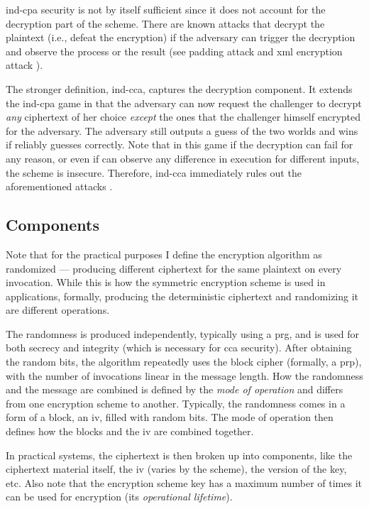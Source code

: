 			\acrshort{ind-cpa} security is not by itself sufficient since it does not account for the decryption part of the scheme.
			There are known attacks that decrypt the plaintext (i.e., defeat the encryption) if the adversary can trigger the decryption and observe the process or the result (see padding attack \cite{padding-attack} and \acrshort{xml} encryption attack \cite{xml-break-encryption}).

			The stronger definition, \acrfull{ind-cca}, captures the decryption component.
			It extends the \acrshort{ind-cpa} game in that the adversary can now request the challenger to decrypt \emph{any} ciphertext of her choice \emph{except} the ones that the challenger himself encrypted for the adversary.
			The adversary still outputs a guess of the two worlds and wins if reliably guesses correctly.
			Note that in this game if the decryption can fail for any reason, or even if \adversary{} can observe any difference in execution for different inputs, the scheme is insecure.
			Therefore, \acrshort{ind-cca} immediately rules out the aforementioned attacks \cite{padding-attack,xml-break-encryption}.

		\subsection{Components}

			Note that for the practical purposes I define the encryption algorithm as randomized --- producing different ciphertext for the same plaintext on every invocation.
			While this is how the symmetric encryption scheme is used in applications, formally, producing the deterministic ciphertext and randomizing it are different operations.

			The randomness is produced independently, typically using a \acrfull{prg}, and is used for both secrecy and integrity (which is necessary for \acrshort{cca} security).
			After obtaining the random bits, the algorithm repeatedly uses the block cipher (formally, a \acrfull{prp}), with the number of invocations linear in the message length.
			How the randomness and the message are combined is defined by the \emph{mode of operation} and differs from one encryption scheme to another.
			Typically, the randomness comes in a form of a block, an \acrfull{iv}, filled with random bits.
			The mode of operation then defines how the blocks and the \acrshort{iv} are combined together.

			In practical systems, the ciphertext is then broken up into components, like the ciphertext material itself, the \acrshort{iv} (varies by the scheme), the version of the key, etc.
			Also note that the encryption scheme key has a maximum number of times it can be used for encryption (its \emph{operational lifetime}).


